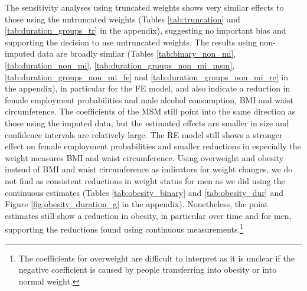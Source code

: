 The sensitivity analyses using truncated weights shows very similar effects to those using the untruncated weights (Tables \ref{tab:truncation} and \ref{tab:duration_groups_tr} in the appendix), suggesting no important bias and supporting the decision to use untruncated weights. The results using non-imputed data are broadly similar (Tables \ref{tab:binary_non_mi}, \ref{tab:duration_non_mi}, \ref{tab:duration_groups_non_mi_msm}, \ref{tab:duration_groups_non_mi_fe} and \ref{tab:duration_groups_non_mi_re} in the appendix), in particular for the \ac{FE} model, and also indicate a reduction in female employment probabilities and male alcohol consumption, \ac{BMI} and waist circumference. The coefficients of the \ac{MSM} still point into the same direction as those using the imputed data, but the estimated effects are smaller in size and confidence intervals are relatively large. The \ac{RE} model still shows a stronger effect on female employment probabilities and smaller reductions in especially the weight measures \ac{BMI} and waist circumference. Using overweight and obesity instead of \ac{BMI} and waist circumference as indicators for weight changes, we do not find as consistent reductions in weight status for men as we did using the continuous estimates (Tables \ref{tab:obesity_binary} and \ref{tab:obesity_dur} and Figure \ref{fig:obesity_duration_g} in the appendix). Nonetheless, the point estimates still show a reduction in obesity, in particular over time and for men, supporting the reductions found using continuous measurements.\footnote{The coefficients for overweight are difficult to interpret as it is unclear if the negative coefficient is caused by people transferring into obesity or into normal weight.}

